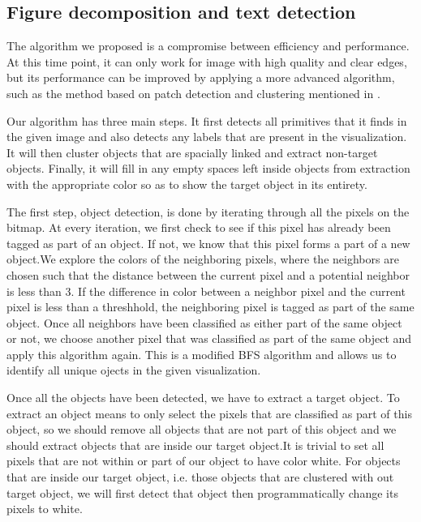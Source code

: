 \documentclass[review,journal]{vgtc}         %
\begin{document}
\subsection{Figure decomposition and text detection}\par
The algorithm we proposed is a compromise between efficiency and performance. At this time point, it can only work for image with high quality and clear edges, but its performance can be improved by applying a more advanced algorithm, such as the method based on patch detection and clustering mentioned in .\par
Our algorithm has three main steps. It first detects all primitives that it finds in the given image and also detects any labels that are present in the visualization. It will then cluster objects that are spacially linked and extract non-target objects. Finally, it will fill in any empty spaces left inside objects from extraction with the appropriate color so as to show the target object in its entirety.\par
The first step, object detection, is done by iterating through all the pixels on the bitmap. At every iteration, we first check to see if this pixel has already been tagged as part of an object. If not, we know that this pixel forms a part of a new object.We explore the colors of the neighboring pixels, where the neighbors are chosen such that the distance between the current pixel and a potential neighbor is less than 3. If the difference in color between a neighbor pixel and the current pixel is less than a threshhold, the neighboring pixel is tagged as part of the same object. Once all neighbors have been classified as either part of the same object or not, we choose another pixel that was classified as part of the same object and apply this algorithm again. This is a modified BFS algorithm and allows us to identify all unique ojects in the given visualization.\par
Once all the objects have been detected, we have to extract a target object. To extract an object means to only select the pixels that are classified as part of this object, so we should remove all objects that are not part of this object and we should extract objects that are inside our target object.It is trivial to set all pixels that are not within or part of our object to have color white. For objects that are inside our target object, i.e. those objects that are clustered with out target object, we will first detect that object then programmatically change its pixels to white.\par
\end{document}
